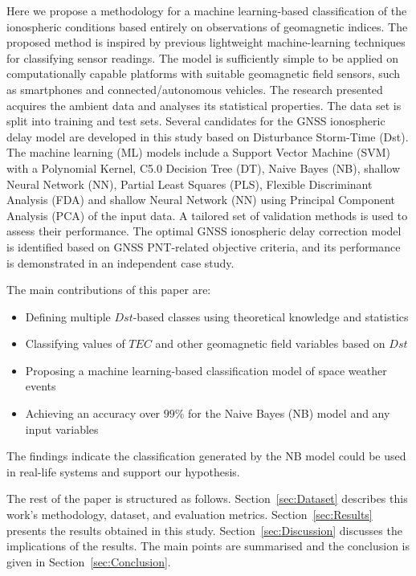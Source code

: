 \documentclass[sn-mathphys-num]{sn-jnl}%
\begin{document}
Here we propose a methodology for a machine learning-based classification of the ionospheric conditions based entirely on observations of geomagnetic indices. The proposed method is inspired by previous lightweight machine-learning techniques \cite{filjar2020comparison} for classifying sensor readings. The model is sufficiently simple to be applied on computationally capable platforms with suitable geomagnetic field sensors, such as smartphones and connected/autonomous vehicles. The research presented acquires the ambient data and analyses its statistical properties. The data set is split into training and test sets. Several candidates for the GNSS ionospheric delay model are developed in this study based on Disturbance Storm-Time (Dst). The machine learning (ML) models include a Support Vector Machine (SVM) with a Polynomial Kernel, C5.0 Decision Tree (DT), Naive Bayes (NB), shallow Neural Network (NN), Partial Least Squares (PLS), Flexible Discriminant Analysis (FDA) and shallow Neural Network (NN) using Principal Component Analysis (PCA) of the input data. A tailored set of validation methods is used to assess their performance. The optimal GNSS ionospheric delay correction model is identified based on GNSS PNT-related objective criteria, and its performance is demonstrated in an independent case study.

The main contributions of this paper are:

\begin{itemize}
    \item Defining multiple $Dst$-based classes using theoretical knowledge and statistics
    \item Classifying values of $TEC$ and other geomagnetic field variables based on $Dst$
    \item Proposing a machine learning-based classification model of space weather events
    \item Achieving an accuracy over $99\%$ for the Naive Bayes (NB) model and any input variables
\end{itemize}

The findings indicate the classification generated by the NB model could be used in real-life systems and support our hypothesis.

The rest of the paper is structured as follows. Section~\ref{sec:Dataset} describes this work's methodology, dataset, and evaluation metrics. Section~\ref{sec:Results} presents the results obtained in this study. Section~\ref{sec:Discussion} discusses the implications of the results. The main points are summarised and the conclusion is given in Section~\ref{sec:Conclusion}.
\end{document}

